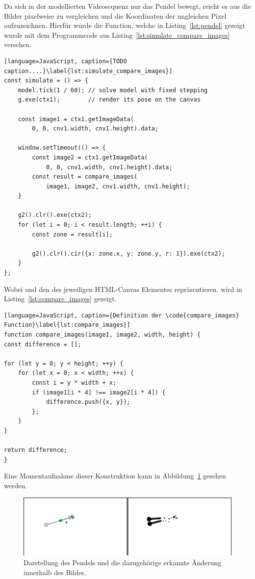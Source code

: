 Da sich in der modellierten Videosequenz nur das Pendel bewegt, reicht es aus die Bilder pixelweise zu vergleichen und die Koordinaten der ungleichen Pixel aufzuzeichnen.
Hierfür wurde die  Function, welche in Listing~\ref{lst:pendel} gezeigt wurde mit dem Programmcode aus Listing~\ref{lst:simulate_compare_images} versehen.

\begin{lstlisting}[language=JavaScript, caption={TODO caption....}\label{lst:simulate_compare_images}]
const simulate = () => {
    model.tick(1 / 60); // solve model with fixed stepping
    g.exe(ctx1);        // render its pose on the canvas

    const image1 = ctx1.getImageData(
        0, 0, cnv1.width, cnv1.height).data;

    window.setTimeout(() => {
        const image2 = ctx1.getImageData(
            0, 0, cnv1.width, cnv1.height).data;
        const result = compare_images(
            image1, image2, cnv1.width, cnv1.height);
    }

    g2().clr().exe(ctx2);
    for (let i = 0; i < result.length; ++i) {
        const zone = result[i];

        g2().clr().cir({x: zone.x, y: zone.y, r: 1}).exe(ctx2);
    }
};
\end{lstlisting}

Wobei  und  den  des jeweiligen HTML-Canvas Elementes repräsentieren.
 wird in Listing~\ref{lst:compare_images} gezeigt.

\begin{lstlisting}[language=JavaScript, caption={Definition der \code{compare_images} Function}\label{lst:compare_images}]
function compare_images(image1, image2, width, height) {
const difference = [];

for (let y = 0; y < height; ++y) {
    for (let x = 0; x < width; ++x) {
        const i = y * width + x;
        if (image1[i * 4] !== image2[i * 4]) {
            difference.push({x, y});
        };
    }
}

return difference;
}
\end{lstlisting}

Eine Momentaufnahme dieser Konstruktion kann in Abbildung~\ref{fig:compare_images} gesehen werden.

\begin{figure}[htb]
	\includegraphics[width=\textwidth]{gfx/compare_images_1.png}
	\caption{Darstellung des Pendels und die dazugehörige erkannte Änderung innerhalb des Bildes.}
	\label{fig:compare_images}
\end{figure}


